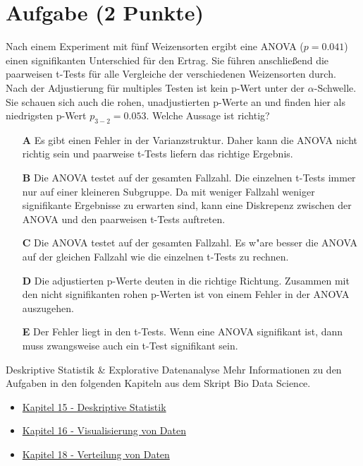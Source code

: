 \documentclass[a4paper, 9pt]{scrartcl}\usepackage[]{graphicx}\usepackage[]{xcolor}
\begin{document}
\section{Aufgabe \hfill (2 Punkte)}

Nach einem Experiment mit f{\"u}nf Weizensorten ergibt eine ANOVA ($p = 0.041$)
einen signifikanten Unterschied f{\"u}r den Ertrag. Sie f{\"u}hren anschlie{\ss}end die
paarweisen t-Tests f{\"u}r alle Vergleiche der verschiedenen Weizensorten
durch. Nach der Adjustierung f{\"u}r multiples Testen ist kein p-Wert unter der
$\alpha$-Schwelle. Sie schauen sich auch die rohen, unadjustierten p-Werte
an und finden hier als niedrigsten p-Wert $p_{3-2} = 0.053$. Welche Aussage
ist richtig? 



\begin{enumerate}
\item [\textbf{A} \msquare] Es gibt einen Fehler in der Varianzstruktur. Daher kann die ANOVA nicht richtig sein und paarweise t-Tests liefern das richtige Ergebnis.
\item [\textbf{B} \msquare] Die ANOVA testet auf der gesamten Fallzahl. Die einzelnen t-Tests immer nur auf einer kleineren Subgruppe. Da mit weniger Fallzahl weniger signifikante Ergebnisse zu erwarten sind, kann eine Diskrepenz zwischen der ANOVA und den paarweisen t-Tests auftreten.
\item [\textbf{C} \msquare] Die ANOVA testet auf der gesamten Fallzahl. Es w{"a}re besser die ANOVA auf der gleichen Fallzahl wie die einzelnen t-Tests zu rechnen.
\item [\textbf{D} \msquare] Die adjustierten p-Werte deuten in die richtige Richtung. Zusammen mit den nicht signifikanten rohen p-Werten ist von einem Fehler in der ANOVA auszugehen.
\item [\textbf{E} \msquare] Der Fehler liegt in den t-Tests. Wenn eine ANOVA signifikant ist, dann muss zwangsweise auch ein t-Test signifikant sein.
\end{enumerate}

\clearpage
\begin{graybox}{Deskriptive Statistik \& Explorative Datenanalyse}
Mehr Informationen zu den Aufgaben in den folgenden Kapiteln aus dem Skript Bio Data Science.
  \begin{itemize}
  \item \href{https://jkruppa.github.io/eda-descriptive.html}{Kapitel 15 - Deskriptive Statistik}
  \item \href{https://jkruppa.github.io/eda-ggplot.html}{Kapitel 16 - Visualisierung von Daten}
  \item \href{https://jkruppa.github.io/eda-distribution.html}{Kapitel 18 - Verteilung von Daten}
  \end{itemize}
\end{graybox}
\clearpage
\end{document}
